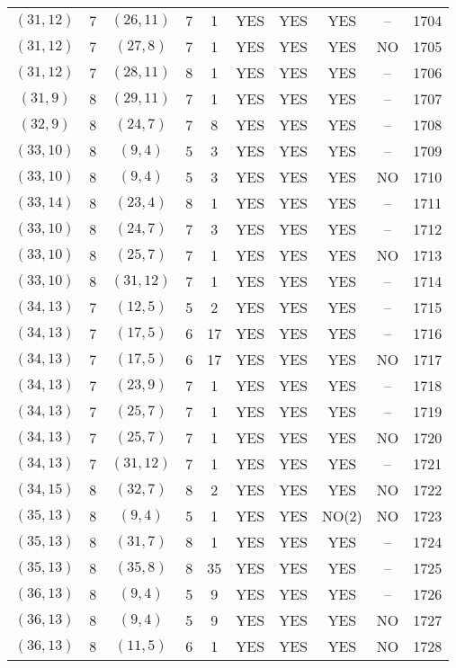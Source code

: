\begin{longtable}{|c|c|c|c|c|c|c|c|c|c|}
$(31, 12)$ & 7 & $(26, 11)$ & 7 & 1 & YES & YES & YES & -- & 1704\\
$(31, 12)$ & 7 & $(27, 8)$ & 7 & 1 & YES & YES & YES & NO & 1705\\
$(31, 12)$ & 7 & $(28, 11)$ & 8 & 1 & YES & YES & YES & -- & 1706\\
$(31, 9)$ & 8 & $(29, 11)$ & 7 & 1 & YES & YES & YES & -- & 1707\\
$(32, 9)$ & 8 & $(24, 7)$ & 7 & 8 & YES & YES & YES & -- & 1708\\
$(33, 10)$ & 8 & $(9, 4)$ & 5 & 3 & YES & YES & YES & -- & 1709\\
$(33, 10)$ & 8 & $(9, 4)$ & 5 & 3 & YES & YES & YES & NO & 1710\\
$(33, 14)$ & 8 & $(23, 4)$ & 8 & 1 & YES & YES & YES & -- & 1711\\
$(33, 10)$ & 8 & $(24, 7)$ & 7 & 3 & YES & YES & YES & -- & 1712\\
$(33, 10)$ & 8 & $(25, 7)$ & 7 & 1 & YES & YES & YES & NO & 1713\\
$(33, 10)$ & 8 & $(31, 12)$ & 7 & 1 & YES & YES & YES & -- & 1714\\
$(34, 13)$ & 7 & $(12, 5)$ & 5 & 2 & YES & YES & YES & -- & 1715\\
$(34, 13)$ & 7 & $(17, 5)$ & 6 & 17 & YES & YES & YES & -- & 1716\\
$(34, 13)$ & 7 & $(17, 5)$ & 6 & 17 & YES & YES & YES & NO & 1717\\
$(34, 13)$ & 7 & $(23, 9)$ & 7 & 1 & YES & YES & YES & -- & 1718\\
$(34, 13)$ & 7 & $(25, 7)$ & 7 & 1 & YES & YES & YES & -- & 1719\\
$(34, 13)$ & 7 & $(25, 7)$ & 7 & 1 & YES & YES & YES & NO & 1720\\
$(34, 13)$ & 7 & $(31, 12)$ & 7 & 1 & YES & YES & YES & -- & 1721\\
$(34, 15)$ & 8 & $(32, 7)$ & 8 & 2 & YES & YES & YES & NO & 1722\\
$(35, 13)$ & 8 & $(9, 4)$ & 5 & 1 & YES & YES & NO(2) & NO & 1723\\
$(35, 13)$ & 8 & $(31, 7)$ & 8 & 1 & YES & YES & YES & -- & 1724\\
$(35, 13)$ & 8 & $(35, 8)$ & 8 & 35 & YES & YES & YES & -- & 1725\\
$(36, 13)$ & 8 & $(9, 4)$ & 5 & 9 & YES & YES & YES & -- & 1726\\
$(36, 13)$ & 8 & $(9, 4)$ & 5 & 9 & YES & YES & YES & NO & 1727\\
$(36, 13)$ & 8 & $(11, 5)$ & 6 & 1 & YES & YES & YES & NO & 1728\\

\end{longtable}
